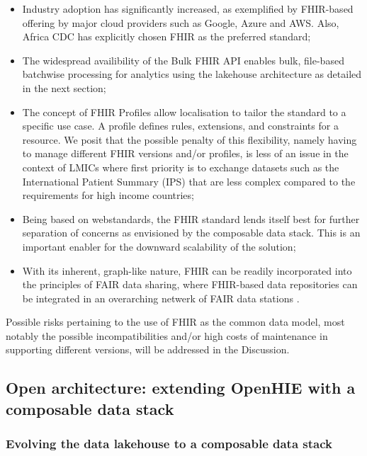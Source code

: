\documentclass[
  authoryear]{elsarticle}
\providecommand{\tightlist}{%
  \setlength{\itemsep}{0pt}\setlength{\parskip}{0pt}}\usepackage{longtable,booktabs,array}
\begin{document}
\begin{itemize}
\tightlist
\item
  Industry adoption has significantly increased, as exemplified by
  FHIR-based offering by major cloud providers such as Google, Azure and
  AWS. Also, Africa CDC has explicitly chosen FHIR as the preferred
  standard;
\item
  The widespread availibility of the Bulk FHIR API
  \citep{mandl2020push, jones2021landscape} enables bulk, file-based
  batchwise processing for analytics using the lakehouse architecture as
  detailed in the next section;
\item
  The concept of FHIR Profiles allow localisation to tailor the standard
  to a specific use case. A profile defines rules, extensions, and
  constraints for a resource. We posit that the possible penalty of this
  flexibility, namely having to manage different FHIR versions and/or
  profiles, is less of an issue in the context of LMICs where first
  priority is to exchange datasets such as the International Patient
  Summary (IPS) that are less complex compared to the requirements for
  high income countries;
\item
  Being based on webstandards, the FHIR standard lends itself best for
  further separation of concerns as envisioned by the composable data
  stack. This is an important enabler for the downward scalability of
  the solution;
\item
  With its inherent, graph-like nature, FHIR can be readily incorporated
  into the principles of FAIR data sharing, where FHIR-based data
  repositories can be integrated in an overarching netwerk of FAIR data
  stations \citep{sinaci2023data, pedrera-jimenez2023can}.
\end{itemize}

Possible risks pertaining to the use of FHIR as the common data model,
most notably the possible incompatibilities and/or high costs of
maintenance in supporting different versions, will be addressed in the
Discussion.

\subsection{Open architecture: extending OpenHIE with a composable data
stack}\label{open-architecture-extending-openhie-with-a-composable-data-stack}

\subsubsection{Evolving the data lakehouse to a composable data
stack}\label{evolving-the-data-lakehouse-to-a-composable-data-stack}
\end{document}
